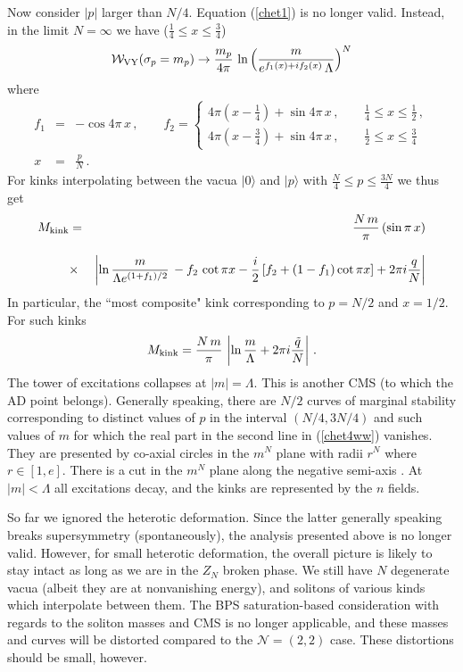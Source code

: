 \documentclass[epsfig,12pt]{article}
\def\beq{\begin{equation}}
\def\eeq{\end{equation}}
\def\beqn{\begin{eqnarray}}
\def\eeqn{\end{eqnarray}}
\newcommand{\cw}{{\mathcal W}}
\def\beqn{\begin{eqnarray}}
\def\eeqn{\end{eqnarray}}
\def\beq{\begin{equation}}
\def\eeq{\end{equation}}
\newcommand{\ntwot}{${\mathcal N}= \left(2,2\right) $ }
\begin{document}
{Now consider $|p|$ larger than $N/4$. Equation (\ref{chet1}) is no longer valid. Instead, in the
limit $N=\infty$ we have ($\frac{1}{4}\leq x\leq \frac{3}{4}$)
\beq
\cw_{\rm VY}(\sigma_p=m_p)\to \frac{m_p}{4\pi}\,\ln\left(\frac{m}{e^{f_1(x)+i f_2(x)}\,\Lambda }\right)^N
\label{chet2}
\eeq
where
\beqn
f_1 
&=&
 -\cos 4\pi\,x\,,\qquad f_2 = \left\{\begin{array}{l}
4\pi\left(x-\frac{1}{4}\right) +\sin 4\pi\,x\,,\qquad \frac{1}{4}\leq x\leq \frac{1}{2}\,,\\[3mm]
4\pi\left(x-\frac{3}{4}\right) +\sin 4\pi\,x\,,\qquad \frac{1}{2}\leq x\leq \frac{3}{4}
\end{array}
\right.
\label{chet2w}
\\[3mm]
x
&=& \frac{p}{N}\,.
\label{chet2ww}
\eeqn 
For kinks interpolating between the  vacua $|0\rangle$ and  $|p\rangle$  with $\frac{N}{4}\leq p\leq \frac{3N}{4}$
we thus get
\beqn
M_{\rm kink} 
&=&
\frac{N\,m}{\pi}\left(\sin \pi\,x\right)
\nonumber\\[3mm]
&\times&
\left|
\ln\frac{m}{\Lambda e^{(1+f_1)/2}} \, - f_2\,\cot \pi x -\frac{i}{2}\left[f_2 +(1-f_1)\cot\pi x
\right]+2\pi i \frac{q}{N}
\right|
\nonumber\\
\label{chet4ww}
\eeqn
In particular, the
 ``most composite"  kink corresponding to $p=N/2$ and $x=1/2$.
For such kinks 
\beq
M_{\rm kink} 
=
\frac{N\,m}{\pi}\,\left|\ln\frac{m}{\Lambda} +2\pi i\frac{\tilde q}{N}
\right|\,.
\label{chet3}
\eeq
The tower of excitations collapses at $|m| = \Lambda$. This is another CMS (to which the AD point belongs).
Generally speaking, there are $N/2$ curves of marginal stability
corresponding to distinct values of $p$ in the interval $(N/4, 3N/4)$
and such values of $m$ for which the real part in the second line in (\ref{chet4ww}) vanishes.
They are presented by co-axial circles in the $m^N$ plane with radii $r^N$
where $r\in [1, e]$. There is a cut in the $m^N$ plane along the negative semi-axis \cite{Olmez}.
At $|m|<\Lambda$ all excitations decay, and the kinks are represented by the $n$ fields.

So far we ignored the heterotic deformation.
Since the latter generally speaking breaks 
supersymmetry (spontaneously), the analysis presented above is no longer valid.
However, for small heterotic deformation, the overall picture is likely to
stay intact as long as we are in the $Z_N$ broken phase. 
We still have $N$ degenerate vacua (albeit they are at nonvanishing energy),
and solitons of various kinds which interpolate between them.
The BPS saturation-based consideration with regards to
the soliton masses and  CMS is no longer applicable,
and these masses and  curves will be distorted compared to the \ntwot case.
These distortions should be small, however.


}
\end{document}
